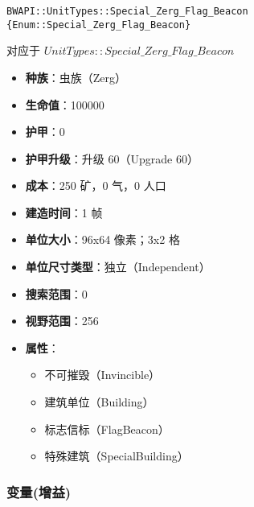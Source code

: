 \begin{tcolorbox}[colback=white, colframe=black!60!white, title=Special\_Zerg\_Flag\_Beacon(), arc=0mm]
    \begin{verbatim}
BWAPI::UnitTypes::Special_Zerg_Flag_Beacon {Enum::Special_Zerg_Flag_Beacon}
    \end{verbatim}
    对应于  $UnitTypes::Special\_Zerg\_Flag\_Beacon$ 
    \begin{itemize}
        \item \textbf{种族}：虫族（Zerg）
        \item \textbf{生命值}：100000
        \item \textbf{护甲}：0
        \item \textbf{护甲升级}：升级 60（Upgrade 60）
        \item \textbf{成本}：250 矿，0 气，0 人口
        \item \textbf{建造时间}：1 帧
        \item \textbf{单位大小}：96x64 像素；3x2 格
        \item \textbf{单位尺寸类型}：独立（Independent）
        \item \textbf{搜索范围}：0
        \item \textbf{视野范围}：256
        \item \textbf{属性}：
            \begin{itemize}
                \item 不可摧毁（Invincible）
                \item 建筑单位（Building）
                \item 标志信标（FlagBeacon）
                \item 特殊建筑（SpecialBuilding）
            \end{itemize}
    \end{itemize}
\end{tcolorbox}

\subsubsection{变量(增益)}

